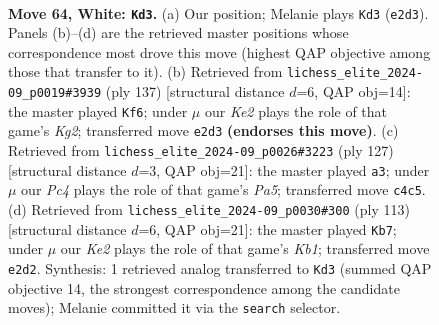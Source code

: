\documentclass[11pt]{article}
\begin{document}
\clearpage

\begin{figure}[p]\centering
\begin{subfigure}{0.46\textwidth}\centering
\resizebox{\linewidth}{!}{%
\newchessgame
\chessboard[
  setfen={8/p5k1/1p6/8/q1P5/8/4K3/8 w - - 0 64},
  showmover=false,
  pgfstyle=straightmove, color=movearrow, markmove={e2-d3}
]}
\caption{}
\end{subfigure}\hfill
\begin{subfigure}{0.46\textwidth}\centering
\resizebox{\linewidth}{!}{%
\newchessgame
\chessboard[
  setfen={2Q5/1P4k1/8/5p2/1K6/4P3/8/6B1 b - - 0 69},
  showmover=false,
  pgfstyle=straightmove, color=movearrow, markmove={g7-f6}
]}
\caption{}
\end{subfigure}
\\[4pt]
\begin{subfigure}{0.46\textwidth}\centering
\resizebox{\linewidth}{!}{%
\newchessgame
\chessboard[
  setfen={3k4/6P1/2Q2P2/8/p7/8/P6K/8 b - - 0 64},
  showmover=false,
  pgfstyle=straightmove, color=movearrow, markmove={a4-a3}
]}
\caption{}
\end{subfigure}\hfill
\begin{subfigure}{0.46\textwidth}\centering
\resizebox{\linewidth}{!}{%
\newchessgame
\chessboard[
  setfen={1k6/8/3P4/p1Q5/6K1/8/8/8 b - - 0 57},
  showmover=false,
  pgfstyle=straightmove, color=movearrow, markmove={b8-b7}
]}
\caption{}
\end{subfigure}
\caption{\textbf{Move 64, White: \texttt{Kd3}.} (a) Our position; Melanie plays \texttt{Kd3} (\texttt{e2d3}). Panels (b)--(d) are the retrieved master positions whose correspondence most drove this move (highest QAP objective among those that transfer to it). (b) Retrieved from \texttt{lichess\_elite\_2024-09\_p0019\#3939} (ply 137) [structural distance $d$=6, QAP obj=14]: the master played \texttt{Kf6}; under $\mu$ our \emph{Ke2} plays the role of that game's \emph{Kg2}; transferred move \texttt{e2d3} \textbf{(endorses this move)}. (c) Retrieved from \texttt{lichess\_elite\_2024-09\_p0026\#3223} (ply 127) [structural distance $d$=3, QAP obj=21]: the master played \texttt{a3}; under $\mu$ our \emph{Pc4} plays the role of that game's \emph{Pa5}; transferred move \texttt{c4c5}. (d) Retrieved from \texttt{lichess\_elite\_2024-09\_p0030\#300} (ply 113) [structural distance $d$=6, QAP obj=21]: the master played \texttt{Kb7}; under $\mu$ our \emph{Ke2} plays the role of that game's \emph{Kb1}; transferred move \texttt{e2d2}. Synthesis: 1 retrieved analog transferred to \texttt{Kd3} (summed QAP objective 14, the strongest correspondence among the candidate moves); Melanie committed it via the \texttt{search} selector.}
\label{fig:thought-m126}
\end{figure}
\end{document}
